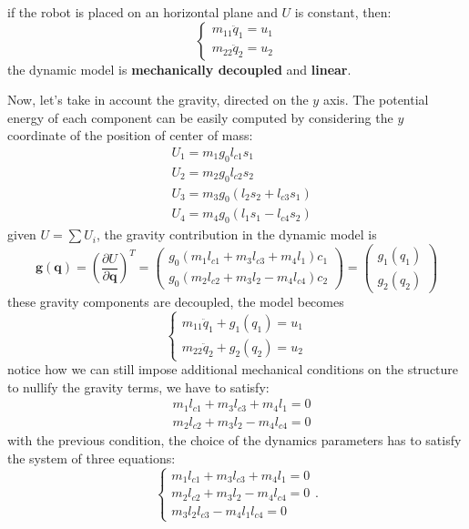 \documentclass[10pt, a4paper]{report}
\newcommand{\q}{{\mathbf q}}
\begin{document}
if the robot is placed on an horizontal plane and $U$ is constant, then:\begin{equation}
    \begin{cases}
        m_{11}\ddot q_1=u_1\\ 
         m_{22}\ddot q_2=u_2
    \end{cases}
\end{equation}
the dynamic model is \textbf{mechanically decoupled} and \textbf{linear}.

Now, let's take in account the gravity, directed on the $y$ axis. The potential energy of each component can be easily computed by considering the $y$ coordinate of the position of center of mass:\begin{align}
    &U_1=m_1g_0l_{c1}s_1\\ 
    &U_2=m_2g_0l_{c2}s_2\\ 
    &U_3=m_3g_0(l_{2}s_2+l_{c3}s_1)\\
    &U_4=m_4g_0( l_1s_1-l_{c4}s_2)
\end{align}
given $U=\sum U_i$, the gravity contribution in the dynamic model is\begin{equation}
    \mathbf g(\q)=\left(\frac{\partial U}{\partial \q}\right)^T=\begin{pmatrix}
        g_0(m_1l_{c1}+m_3l_{c3}+m_4l_1)c_1\\
        g_0(m_2l_{c2}+m_3l_{2}-m_4l_{c4})c_2
    \end{pmatrix}=\begin{pmatrix}
      g_1(q_1)\\ g_2(q_2)
    \end{pmatrix}
\end{equation}
these gravity components are decoupled, the model becomes\begin{equation}
    \begin{cases}
        m_{11}\ddot q_1+g_1(q_1)=u_1\\ 
         m_{22}\ddot q_2+g_2(q_2)=u_2
    \end{cases}
\end{equation}
notice how we can still impose additional mechanical conditions on the structure to nullify the gravity terms, we have to satisfy:\begin{align}
   & m_1l_{c1}+m_3l_{c3}+m_4l_1=0\\
   & m_2l_{c2}+m_3l_{2}-m_4l_{c4}=0
\end{align}
with the previous condition, the choice of the dynamics parameters has to satisfy the system of three equations:\begin{equation}
    \begin{cases}
        m_1l_{c1}+m_3l_{c3}+m_4l_1=0\\
        m_2l_{c2}+m_3l_{2}-m_4l_{c4}=0\\
        m_3l_2l_{c3}-m_4l_1l_{c4}=0
    \end{cases}.
\end{equation}
\end{document}
